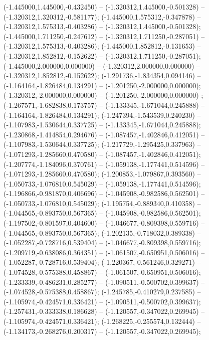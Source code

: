  (-1.445000,1.445000,-0.432450) -- (-1.320312,1.445000,-0.501328) -- (-1.320312,1.320312,-0.581177);
 (-1.445000,1.575312,-0.347878) -- (-1.320312,1.575313,-0.403286) -- (-1.320312,1.445000,-0.501328);
 (-1.445000,1.711250,-0.247612) -- (-1.320312,1.711250,-0.287051) -- (-1.320312,1.575313,-0.403286);
 (-1.445000,1.852812,-0.131653) -- (-1.320312,1.852812,-0.152622) -- (-1.320312,1.711250,-0.287051);
 (-1.445000,2.000000,0.000000) -- (-1.320312,2.000000,0.000000) -- (-1.320312,1.852812,-0.152622);
 (-1.291736,-1.834354,0.094146) -- (-1.164164,-1.826484,0.134291) -- (-1.201250,-2.000000,0.000000);
 (-1.320312,-2.000000,0.000000) -- (-1.201250,-2.000000,0.000000) ;
 (-1.267571,-1.682838,0.173757) -- (-1.133345,-1.671044,0.245888) -- (-1.164164,-1.826484,0.134291);
 (-1.247394,-1.543539,0.240230) -- (-1.107983,-1.530644,0.337725) -- (-1.133345,-1.671044,0.245888);
 (-1.230868,-1.414854,0.294676) -- (-1.087457,-1.402846,0.412051) -- (-1.107983,-1.530644,0.337725);
 (-1.217729,-1.295425,0.337963) -- (-1.071293,-1.285660,0.470580) -- (-1.087457,-1.402846,0.412051);
 (-1.207774,-1.184096,0.370761) -- (-1.059138,-1.177441,0.514596) -- (-1.071293,-1.285660,0.470580);
 (-1.200853,-1.079867,0.393560) -- (-1.050733,-1.076810,0.545029) -- (-1.059138,-1.177441,0.514596);
 (-1.196866,-0.981870,0.406696) -- (-1.045908,-0.982586,0.562501) -- (-1.050733,-1.076810,0.545029);
 (-1.195754,-0.889340,0.410358) -- (-1.044565,-0.893750,0.567365) -- (-1.045908,-0.982586,0.562501);
 (-1.197502,-0.801597,0.404600) -- (-1.046677,-0.809398,0.559716) -- (-1.044565,-0.893750,0.567365);
 (-1.202135,-0.718032,0.389338) -- (-1.052287,-0.728716,0.539404) -- (-1.046677,-0.809398,0.559716);
 (-1.209719,-0.638086,0.364351) -- (-1.061507,-0.650951,0.506016) -- (-1.052287,-0.728716,0.539404);
 (-1.220367,-0.561246,0.329271) -- (-1.074528,-0.575388,0.458867) -- (-1.061507,-0.650951,0.506016);
 (-1.233339,-0.486231,0.285277) -- (-1.090511,-0.500702,0.399637) -- (-1.074528,-0.575388,0.458867);
 (-1.245785,-0.410279,0.237585) -- (-1.105974,-0.424571,0.336421) -- (-1.090511,-0.500702,0.399637);
 (-1.257431,-0.333338,0.186628) -- (-1.120557,-0.347022,0.269945) -- (-1.105974,-0.424571,0.336421);
 (-1.268225,-0.255574,0.132444) -- (-1.134173,-0.268276,0.200317) -- (-1.120557,-0.347022,0.269945);
